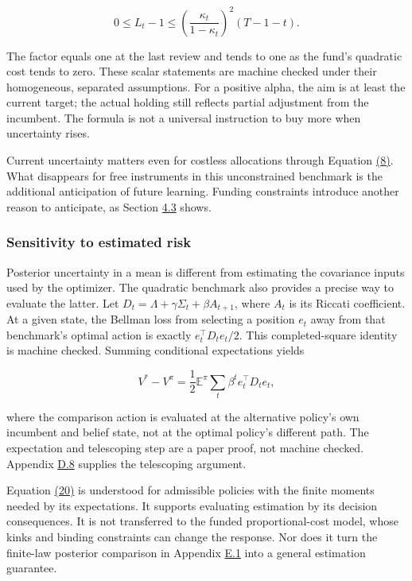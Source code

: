 \documentclass[11pt]{article}
\begin{document}
\begin{equation*}
0\leq L_t-1\leq
\left(\frac{\kappa_t}{1-\kappa_t}\right)^2(T-1-t).
\tag{19}\label{eq:19}
\end{equation*}

The factor equals one at the last review and tends to one as the fund's quadratic cost tends to zero. These scalar statements are machine checked under their homogeneous, separated assumptions. For a positive alpha, the aim is at least the current target; the actual holding still reflects partial adjustment from the incumbent. The formula is not a universal instruction to buy more when uncertainty rises.

Current uncertainty matters even for costless allocations through Equation \hyperref[eq:8]{(8)}. What disappears for free instruments in this unconstrained benchmark is the additional anticipation of future learning. Funding constraints introduce another reason to anticipate, as Section \hyperref[sec:4.3]{4.3} shows.

\subsubsection*{Sensitivity to estimated risk}

Posterior uncertainty in a mean is different from estimating the covariance inputs used by the optimizer. The quadratic benchmark also provides a precise way to evaluate the latter. Let \(D_t=\Lambda+\gamma\Sigma_t+\beta A_{t+1}\), where \(A_t\) is its Riccati coefficient. At a given state, the Bellman loss from selecting a position \(e_t\) away from that benchmark's optimal action is exactly \(e_t^\top D_t e_t/2\). This completed-square identity is machine checked. Summing conditional expectations yields

\begin{equation*}
V^*-V^\pi=\frac12\mathbb E^\pi\sum_t\beta^t e_t^\top D_t e_t,
\tag{20}\label{eq:20}
\end{equation*}

where the comparison action is evaluated at the alternative policy's own incumbent and belief state, not at the optimal policy's different path. The expectation and telescoping step are a paper proof, not machine checked. Appendix \hyperref[sec:D.8]{D.8} supplies the telescoping argument.

Equation \hyperref[eq:20]{(20)} is understood for admissible policies with the finite moments needed by its expectations. It supports evaluating estimation by its decision consequences. It is not transferred to the funded proportional-cost model, whose kinks and binding constraints can change the response. Nor does it turn the finite-law posterior comparison in Appendix \hyperref[sec:E.1]{E.1} into a general estimation guarantee.
\end{document}
